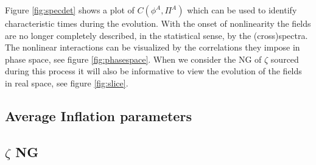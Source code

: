 Figure \ref{fig:specdet} shows a plot of $C(\phi^A,\Pi^A)$ which can be used to identify characteristic times during the evolution.
With the onset of nonlinearity the fields are no longer completely described, in the statistical sense, by the (cross)spectra.
The nonlinear interactions can be visualized by the correlations they impose in phase space, see figure \ref{fig:phasespace}.
When we consider the NG of $\zeta$ sourced during this process it will also be informative to view the evolution of the fields in real space, see figure \ref{fig:slice}.

\Fphasespace

\Fslice


\subsection{Average Inflation parameters} \label{sec:infl}



\subsection{$\zeta$ NG} \label{sec:zeta ng}

